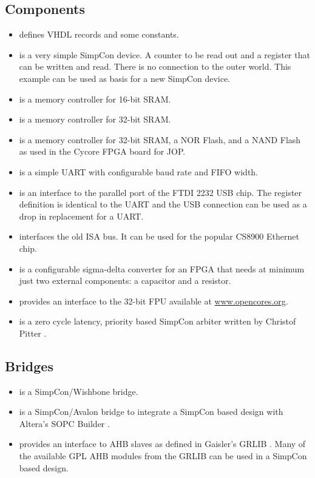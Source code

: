 \subsection{Components}

\begin{itemize}
    \item {} defines VHDL records and some
    constants.
    \item {} is a very simple SimpCon device. A
    counter to be read out and a register that can be written and
    read. There is no connection to the outer world. This example
    can be used as basis for a new SimpCon device.
    \item {} is a memory controller for 16-bit
    SRAM.
    \item {} is a memory controller for 32-bit
    SRAM.
    \item {} is a memory controller for 32-bit
    SRAM, a NOR Flash, and a NAND Flash as used in the Cycore FPGA board for JOP.
    \item {} is a simple UART with configurable
    baud rate and FIFO width.
    \item {} is an interface to the parallel port of
    the FTDI 2232 USB chip. The register definition is identical to
    the UART and the USB connection can be used as a drop in
    replacement for a UART.
    \item {} interfaces the old ISA bus. It can be used
    for the popular CS8900 Ethernet chip.
    \item {} is a configurable sigma-delta converter
    for an FPGA that needs at minimum just two external components:
    a capacitor and a resistor.
    \item {} provides an interface to the 32-bit FPU available
    at \url{www.opencores.org}.
    \item {} is a zero cycle latency, priority
    based SimpCon arbiter written by Christof Pitter \cite{jop:cmp}.
\end{itemize}

\subsection{Bridges}

\begin{itemize}
    \item {} is a SimpCon/Wishbone \cite{soc:wishbone}
    bridge.
    \item {} is a SimpCon/Avalon \cite{soc:avalon}
    bridge to integrate a SimpCon based design with Altera's SOPC
    Builder \cite{quartus}.
    \item {} provides an interface to AHB slaves as
    defined in Gaisler's GRLIB \cite{grlib}. Many of the available
    GPL AHB modules from the GRLIB can be used in a SimpCon based
    design.
\end{itemize}


